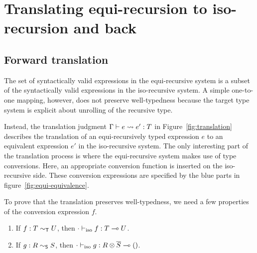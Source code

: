 \section{Translating equi-recursion to iso-recursion and back}

\subsection{Forward translation}
\label{sec:forward}


The set of syntactically valid expressions in the equi-recursive system is a
subset of the syntactically valid expressions in the iso-recursive system. A
simple one-to-one mapping, however, does not preserve well-typedness because
the target type system is explicit about unrolling of the recursive type.



Instead, the translation judgment $\translation e {e'} T$ in
Figure~\ref{fig:translation} describes the translation of an equi-recursively
typed expression $e$ to an equivalent expression $e'$ in the iso-recursive
system. The only interesting part of the translation process is where the
equi-recursive system makes use of type conversions. Here, an appropriate
conversion function is inserted on the iso-recursive side. These
conversion expressions are specified by the blue parts in figure~\ref{fig:equi-equivalence}.
\begin{mathpar}
\end{mathpar}

To prove that the translation preserves well-typedness, we
need a few properties of the conversion expression $f$.
\begin{lemma}
  \begin{enumerate}
  \item If $f : T \eqt U$, then $\typing[\CNil]{\tyIso f}{\TFun TU}$.
  \item If $g : R \eqs S$, then $\typing[\CNil]{\tyIso g}{\TFun{\TPair
      R {\TDual S}} \TUnit}$.
  \end{enumerate}
\end{lemma}

